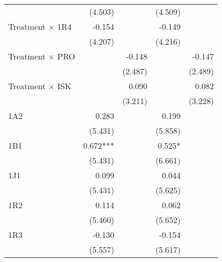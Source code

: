 \begin{table}[htbp]
\begin{tabular}{l*{4}{D{.}{.}{-1}}}
					&             (4.503)   &                       &             (4.509)   &                       \\
Treatment $\times$ 1R4&               -0.154  &                     &           -0.149    &                         \\
					&             (4.207)   &                       &             (4.216)   &                       \\
Treatment $\times$ PRO&                       &            -0.148   &                     &           -0.147        \\
					&                       &             (2.487)   &                       &             (2.489)   \\
Treatment $\times$ ISK&                       &                  0.090 &                     &               0.082   \\
					&                       &             (3.211)   &                       &             (3.228)   \\
1A2                 &               0.283   &                       &               0.199   &                       \\
                    &             (5.431)   &                       &             (5.858)   &                       \\
1B1                 &               0.672***&                       &               0.525*  &                       \\
                    &             (5.431)   &                       &             (6.661)   &                       \\
1J1                 &               0.099   &                       &               0.044   &                       \\
                    &             (5.431)   &                       &             (5.625)   &                       \\
1R2                 &               0.114   &                       &               0.062   &                       \\
                    &             (5.460)   &                       &             (5.652)   &                       \\
1R3                 &              -0.130   &                       &              -0.154   &                       \\
                    &             (5.557)   &                       &             (5.617)   &                       \\

\end{tabular}
\end{table}
